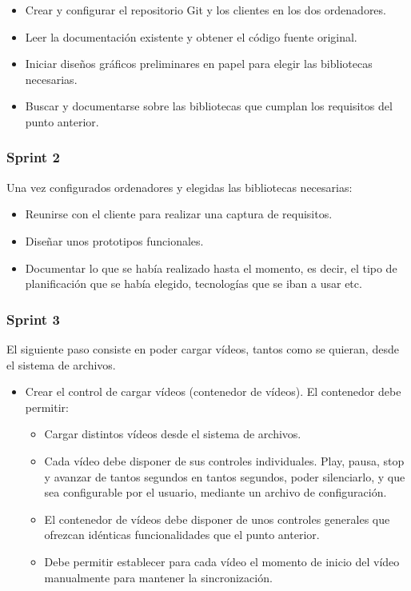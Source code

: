 \begin{itemize}
    \item Crear y configurar el repositorio Git y los clientes en los dos ordenadores.
    \item Leer la documentaci\'{o}n existente y obtener el c\'{o}digo fuente original.
    \item Iniciar dise\~{n}os gr\'{a}ficos preliminares en papel para elegir las bibliotecas 
    necesarias.
    \item Buscar y documentarse sobre las bibliotecas que cumplan los requisitos del punto 
    anterior. 
\end{itemize} 

\subsubsection{Sprint 2}
Una vez configurados ordenadores y elegidas las bibliotecas necesarias:

\begin{itemize}
    \item Reunirse con el cliente para realizar una captura de requisitos.
    \item Dise\~{n}ar unos prototipos funcionales.
    \item Documentar lo que se hab\'{i}a realizado hasta el momento, es decir, el tipo de 
    planificaci\'{o}n que se hab\'{i}a elegido,
    tecnolog\'{i}as que se iban a usar etc.
\end{itemize}

\subsubsection{Sprint 3}
El siguiente paso consiste en poder cargar v\'{i}deos, tantos como se quieran, desde el sistema de archivos.

\begin{itemize}
    \item Crear el control de cargar v\'{i}deos (contenedor de v\'{i}deos). El contenedor debe 
    permitir:
    \begin{itemize}
        \item Cargar distintos v\'{i}deos desde el sistema de archivos.
        \item Cada v\'{i}deo debe disponer de sus controles individuales. Play, pausa, stop y 
        avanzar de tantos segundos en tantos 
        segundos, poder silenciarlo, y que sea configurable por el usuario, mediante un archivo 
        de configuraci\'{o}n.
        \item El contenedor de v\'{i}deos debe disponer de unos controles generales que ofrezcan 
        id\'enticas funcionalidades
        que el punto anterior.
        \item Debe permitir establecer para cada v\'{i}deo el momento de inicio del v\'{i}deo 
        manualmente para mantener la 
        sincronizaci\'{o}n.
    \end{itemize}
\end{itemize}

